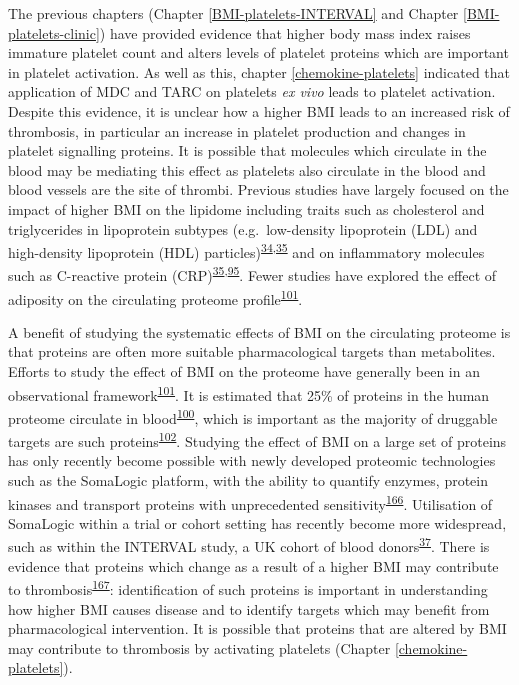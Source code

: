 \documentclass[11pt,twoside]{bristolthesis}
\begin{document}
The previous chapters (Chapter \ref{BMI-platelets-INTERVAL} and Chapter \ref{BMI-platelets-clinic}) have provided evidence that higher body mass index raises immature platelet count and alters levels of platelet proteins which are important in platelet activation. As well as this, chapter \ref{chemokine-platelets} indicated that application of MDC and TARC on platelets \emph{ex vivo} leads to platelet activation. Despite this evidence, it is unclear how a higher BMI leads to an increased risk of thrombosis, in particular an increase in platelet production and changes in platelet signalling proteins. It is possible that molecules which circulate in the blood may be mediating this effect as platelets also circulate in the blood and blood vessels are the site of thrombi. Previous studies have largely focused on the impact of higher BMI on the lipidome including traits such as cholesterol and triglycerides in lipoprotein subtypes (e.g.~low-density lipoprotein (LDL) and high-density lipoprotein (HDL) particles)\textsuperscript{\protect\hyperlink{ref-Bell2018a}{34},\protect\hyperlink{ref-Wurtz2014}{35}} and on inflammatory molecules such as C-reactive protein (CRP)\textsuperscript{\protect\hyperlink{ref-Wurtz2014}{35},\protect\hyperlink{ref-Timpson2011}{95}}. Fewer studies have explored the effect of adiposity on the circulating proteome profile\textsuperscript{\protect\hyperlink{ref-Cominetti2018}{101}}.

A benefit of studying the systematic effects of BMI on the circulating proteome is that proteins are often more suitable pharmacological targets than metabolites. Efforts to study the effect of BMI on the proteome have generally been in an observational framework\textsuperscript{\protect\hyperlink{ref-Cominetti2018}{101}}. It is estimated that 25\% of proteins in the human proteome circulate in blood\textsuperscript{\protect\hyperlink{ref-Gold2012}{100}}, which is important as the majority of druggable targets are such proteins\textsuperscript{\protect\hyperlink{ref-Imming2006}{102}}. Studying the effect of BMI on a large set of proteins has only recently become possible with newly developed proteomic technologies such as the SomaLogic platform, with the ability to quantify enzymes, protein kinases and transport proteins with unprecedented sensitivity\textsuperscript{\protect\hyperlink{ref-Rohloff2014}{166}}. Utilisation of SomaLogic within a trial or cohort setting has recently become more widespread, such as within the INTERVAL study, a UK cohort of blood donors\textsuperscript{\protect\hyperlink{ref-Sun2018}{37}}. There is evidence that proteins which change as a result of a higher BMI may contribute to thrombosis\textsuperscript{\protect\hyperlink{ref-Constantinescu2018}{167}}: identification of such proteins is important in understanding how higher BMI causes disease and to identify targets which may benefit from pharmacological intervention. It is possible that proteins that are altered by BMI may contribute to thrombosis by activating platelets (Chapter \ref{chemokine-platelets}).
\end{document}
